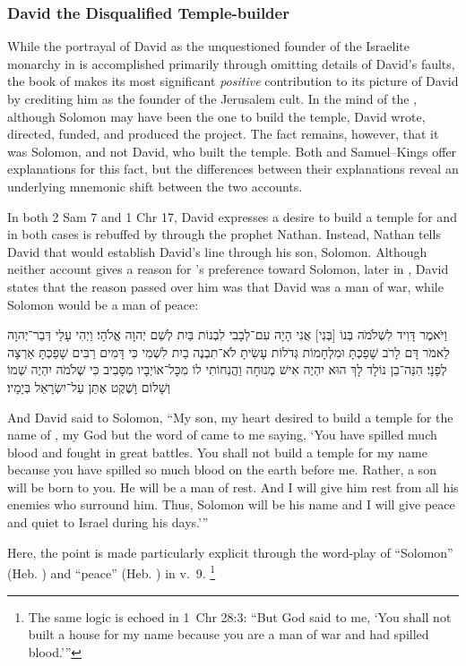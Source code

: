 \subsubsection{David the Disqualified Temple-builder}
While the portrayal of David as the unquestioned founder of the Israelite monarchy in \chronicles is accomplished primarily through omitting details of David's faults, the book of \chronicles makes its most significant \emph{positive} contribution to its picture of David by crediting him as the founder of the Jerusalem cult. In the mind of the \chronicler, although Solomon may have been the one to build the temple, David wrote, directed, funded, and produced the project. The fact remains, however, that it was Solomon, and not David, who built the temple. Both \chronicles and Samuel--Kings offer explanations for this fact, but the differences between their explanations reveal an underlying mnemonic shift between the two accounts.

In both 2 Sam 7 and 1 Chr 17, David expresses a desire to build a temple for \yahweh and in both cases is rebuffed by \yahweh through the prophet Nathan. Instead, Nathan tells David that \yahweh would establish David's line through his son, Solomon. Although neither account gives a reason for \yahweh's preference toward Solomon, later in \chronicles, David states that the reason \yahweh passed over him was that David was a man of war, while Solomon would be a man of peace:

\begin{hebrewtext}
    וַיֹּאמֶר דָּוִיד לִשְׁלֹמֹה בְּנוֹ [בְּנִי] אֲנִי הָיָה עִם־לְבָבִי לִבְנוֹת בַּיִת לְשֵׁם יְהוָה אֱלֹהָי׃ 
    וַיְהִי עָלַי דְּבַר־יְהוָה לֵאמֹר דָּם לָרֹב שָׁפַכְתָּ וּמִלְחָמוֹת גְּדֹלוֹת עָשִׂיתָ לֹא־תִבְנֶה בַיִת לִשְׁמִי כִּי דָּמִים רַבִּים שָׁפַכְתָּ אַרְצָה לְפָנָי׃
    הִנֵּה־בֵן נוֹלָד לָךְ הוּא יִהְיֶה אִישׁ מְנוּחָה וַהֲנִחוֹתִי לוֹ מִכָּל־אוֹיְבָיו מִסָּבִיב כִּי שְׁלֹמֹה יִהְיֶה שְׁמוֹ וְשָׁלוֹם וָשֶׁקֶט אֶתֵּן עַל־יִשְׂרָאֵל בְּיָמָיו׃
\end{hebrewtext}
\begin{translation}
    And David said to Solomon, ``My son, my heart desired to build a temple for the name of \yahweh, my God
    but the word of \yahweh came to me saying, `You have spilled much blood and fought in great battles. You shall not build a temple for my name because you have spilled so much blood on the earth before me.
    Rather, a son will be born to you. He will be a man of rest. And I will give him rest from all his enemies who surround him. Thus, Solomon will be his name and I will give peace and quiet to Israel during his days.'''
\end{translation}
\noindent
Here, the point is made particularly explicit through the word-play of ``Solomon'' (Heb. ) and ``peace'' (Heb. ) in v.~9.%
    \footnote{The same logic is echoed in 1~Chr 28:3:  ``But God said to me, `You shall not built a house for my name because you are a man of war and had spilled blood.'''}

